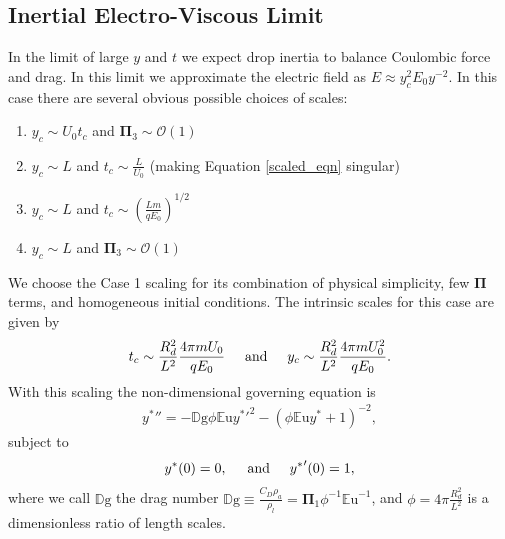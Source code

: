 \documentclass[12pt,a4paper,oneside]{book}
\begin{document}
\subsection{Inertial Electro-Viscous Limit}
In the limit of large $y$ and $t$ we expect drop inertia to balance Coulombic force and drag. In this limit we approximate the electric field as $E \approx y_c^2 E_0 y^{-2}$. In this case there are several obvious possible choices of scales:
\begin{enumerate}
\item $y_c \sim U_0 t_c$ and $\mathbf{\Pi}_3 \sim \mathcal{O}(1)$
\item $y_c \sim L$ and $t_c \sim \frac{L}{U_0}$ (making Equation \ref{scaled_eqn} singular)
\item $y_c \sim L$ and $t_c \sim \left( \frac{L m}{q E_0} \right)^{1/2}$
\item $y_c \sim L$ and $\mathbf{\Pi}_3 \sim \mathcal{O}(1)$
\end{enumerate}

We choose the Case 1 scaling for its combination of physical simplicity, few $\mathbf{\Pi}$ terms, and homogeneous initial conditions. The intrinsic scales for this case are given by
\[ t_c \sim \frac{R_d^2}{L^2} \frac{4 \pi m U_0}{q E_0} \hspace{5mm} \mbox{and} \hspace{5 mm} y_c \sim \frac{R_d^2}{L^2} \frac{4 \pi m U_0^2}{q E_0}.
\]
With this scaling the non-dimensional governing equation is 
\begin{eqnarray}
&{y^*}'' = - \mathbb{D}\mbox{g} \phi \mathbb{E}\mbox{u} {y^*}'^2 - \left( \phi \mathbb{E}\mbox{u} {y^*} + 1 \right)^{-2}, & \label{drag_limit}
\end{eqnarray}
subject to 
\begin{equation*}
{y^*}(0) = 0, \hspace{5 mm} \mbox{and} \hspace{5 mm} {y^*}'(0) = 1, 
\end{equation*}
where we call $\mathbb{D}\mbox{g}$ the drag number $\mathbb{D}\mbox{g} \equiv \frac{C_D \rho_a}{\rho_l} = \mathbf{\Pi}_1 \phi^{-1}{\mathbb{E}\mbox{u}}^{-1}$, and $\phi = 4 \pi \frac{R_d^2}{L^2}$ is a dimensionless ratio of length scales.
\end{document}
